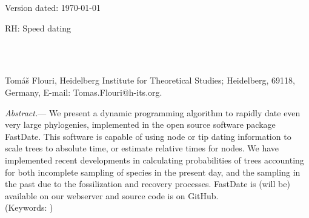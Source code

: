 \documentclass[12pt,letterpaper]{article}
\newcommand{\ejmcomment}[1]{{\color{green} #1}}
\renewcommand{\subsubsection}[1]{%
\vspace{2ex}
\noindent
\textit{#1.}---}
\begin{document}
\begin{flushright}
Version dated: \today
\end{flushright}
\bigskip
\noindent RH: Speed dating


\bigskip
\medskip
\begin{center}

\bigskip




\\
\\
\end{center}
\medskip
{} Tom\'{a}\v{s} Flouri, 
Heidelberg Institute for Theoretical Studies; Heidelberg, 69118, Germany, E-mail: Tomas.Flouri@h-its.org.\\


\vspace{1in}

\subsubsection{Abstract} We present a dynamic programming algorithm to rapidly
date even very large phylogenies, implemented in the open source software package FastDate. 
This software is capable of using node or tip dating information to scale trees to absolute time,
or estimate relative times for nodes.
We have implemented recent developments in calculating probabilities of trees accounting for both incomplete 
sampling of species in the present day, and the sampling in the past due to the fossilization and recovery processes.
FastDate is \ejmcomment{(will be)} available on our webserver and source code is on GitHub.\\
\noindent (Keywords: )\\
\end{document}
